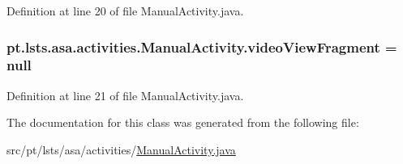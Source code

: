 Definition at line 20 of file Manual\+Activity.\+java.

\hypertarget{classpt_1_1lsts_1_1asa_1_1activities_1_1ManualActivity_aeb07ff0e66cda40c01822aa6cb2a751c}{}
\subsubsection[{video\+View\+Fragment}]{ pt.\+lsts.\+asa.\+activities.\+Manual\+Activity.\+video\+View\+Fragment = null\hspace{0.3cm}{\ttfamily [private]}}\label{classpt_1_1lsts_1_1asa_1_1activities_1_1ManualActivity_aeb07ff0e66cda40c01822aa6cb2a751c}


Definition at line 21 of file Manual\+Activity.\+java.



The documentation for this class was generated from the following file\+:\begin{DoxyCompactItemize}
\item 
src/pt/lsts/asa/activities/\hyperlink{ManualActivity_8java}{Manual\+Activity.\+java}\end{DoxyCompactItemize}
